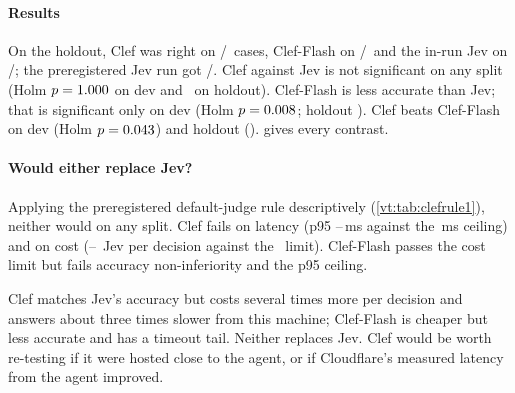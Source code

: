 \paragraph{Results} On the holdout, Clef was right on \ClHoldClefAcc/\HoldN\ cases, Clef-Flash on \ClHoldFlashAcc/\HoldN\
and the in-run Jev on \ClHoldJevAcc/\HoldN; the preregistered Jev run got \JevHoldAccK/\HoldN. Clef against Jev is not
significant on any split (Holm $p = 1.000$ on dev and \ClHoldClefJevHolm\ on holdout). Clef-Flash is less
accurate than Jev; that is significant only on dev (Holm $p = 0.008$; holdout \ClHoldFlashJevHolm). Clef
beats Clef-Flash on dev (Holm $p = 0.043$) and holdout (\ClHoldClefFlashHolm). 
gives every contrast.

\begin{table}[tbp]
\centering\scriptsize
\caption{Post-hoc paired contrasts (McNemar exact test on per-case majority). Holm over the rule-1 family of the two
new arms for comparisons with Jev, and over the pairwise family for Clef against Clef-Flash.}
\label{vt:tab:clefcontrasts}

\end{table}

\paragraph{Would either replace Jev?} Applying the preregistered default-judge rule descriptively (\cref{vt:tab:clefrule1}),
neither would on any split. Clef fails on latency (p95 \ClClefPninetyfiveLow--\ClClefPninetyfiveHigh\,ms against the
\ClRuleOneMaxPninetyfive\,ms ceiling) and on cost (\ClClefCostXLow--\ClClefCostXHigh\X\ Jev per decision against the
\ClRuleOneCostX\X\ limit). Clef-Flash passes the cost limit but fails accuracy non-inferiority and the p95 ceiling.

\begin{table}[tbp]
\centering\small
\caption{The preregistered default-judge rule applied descriptively to the post-hoc arms (NI: non-inferior to the
in-run Jev).}
\label{vt:tab:clefrule1}

\end{table}

\begin{keyidea}
Clef matches Jev's accuracy but costs several times more per decision and answers about three times slower from
this machine; Clef-Flash is cheaper but less accurate and has a timeout tail. Neither replaces Jev. Clef would be
worth re-testing if it were hosted close to the agent, or if Cloudflare's measured latency from the agent improved.
\end{keyidea}
